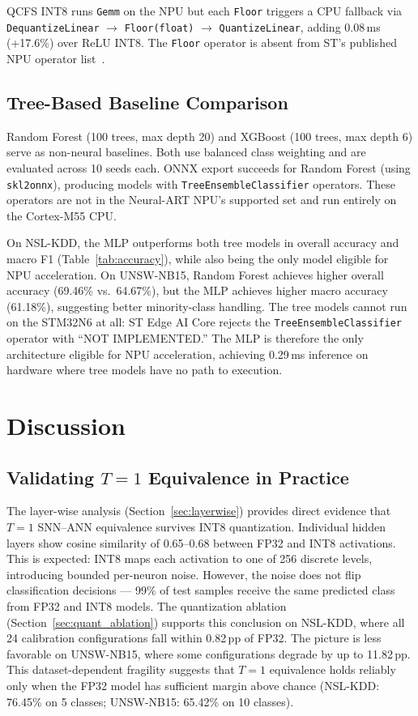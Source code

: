 \documentclass[10pt,twocolumn]{article}
\begin{document}
QCFS INT8 runs \texttt{Gemm} on the NPU but each \texttt{Floor}
triggers a CPU fallback via \mbox{\texttt{DequantizeLinear}}
$\to$ \mbox{\texttt{Floor(float)}} $\to$ \mbox{\texttt{QuantizeLinear}},
adding 0.08\,ms (+17.6\%) over ReLU INT8.
The \texttt{Floor} operator is absent from ST's published
NPU operator list~\cite{st_neural_art}.

\subsection{Tree-Based Baseline Comparison}

Random Forest (100 trees, max depth 20) and XGBoost (100 trees, max
depth 6) serve as non-neural baselines.
Both use balanced class weighting and are evaluated across 10 seeds each.
ONNX export succeeds for Random Forest (using \texttt{skl2onnx}),
producing models with \texttt{TreeEnsembleClassifier} operators.
These operators are not in the Neural-ART NPU's supported set and
run entirely on the Cortex-M55 CPU.

On NSL-KDD, the MLP outperforms both tree models in overall accuracy
and macro F1 (Table~\ref{tab:accuracy}), while also being the only model
eligible for NPU acceleration.
On UNSW-NB15, Random Forest achieves higher overall accuracy (69.46\%
vs.\ 64.67\%), but the MLP achieves higher macro accuracy (61.18\%),
suggesting better minority-class handling.
The tree models cannot run on the STM32N6 at all:
ST Edge AI Core rejects the \texttt{TreeEnsembleClassifier} operator
with ``NOT IMPLEMENTED.''
The MLP is therefore the only architecture eligible for NPU acceleration,
achieving 0.29\,ms inference on hardware where tree models have no path
to execution.

\section{Discussion}
\label{sec:discussion}

\subsection{Validating \texorpdfstring{$T{=}1$}{T=1} Equivalence in Practice}

The layer-wise analysis (Section~\ref{sec:layerwise}) provides direct
evidence that $T{=}1$ SNN--ANN equivalence survives INT8 quantization.
Individual hidden layers show cosine similarity of 0.65--0.68 between
FP32 and INT8 activations. This is expected: INT8 maps each activation
to one of 256 discrete levels, introducing bounded per-neuron noise.
However, the noise does not flip classification decisions ---
99\% of test samples receive the same predicted class from FP32
and INT8 models.
The quantization ablation (Section~\ref{sec:quant_ablation}) supports
this conclusion on NSL-KDD, where all 24 calibration configurations
fall within 0.82\,pp of FP32.
The picture is less favorable on UNSW-NB15, where some configurations
degrade by up to 11.82\,pp. This dataset-dependent fragility suggests
that $T{=}1$ equivalence holds reliably only when the FP32 model
has sufficient margin above chance (NSL-KDD: 76.45\% on 5 classes;
UNSW-NB15: 65.42\% on 10 classes).
\end{document}
